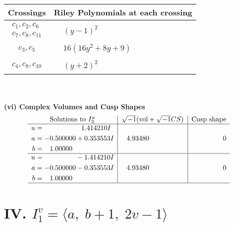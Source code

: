 \documentclass[1p]{elsarticle_modified}
\theoremstyle{definition}
\newcommand{\I}{\sqrt{-1}}
\begin{document}
\begin{tabular}{m{50pt}|m{274pt}}
Crossings & \hspace{64pt}Riley Polynomials at each crossing \\
\hline $$\begin{aligned}c_{1},c_{2},c_{6}\\c_{7},c_{8},c_{11}\end{aligned}$$&$\begin{aligned}
&(y-1)^2
\end{aligned}$\\
\hline $$\begin{aligned}c_{3},c_{5}\end{aligned}$$&$\begin{aligned}
&16(16 y^2+8 y+9)
\end{aligned}$\\
\hline $$\begin{aligned}c_{4},c_{9},c_{10}\end{aligned}$$&$\begin{aligned}
&(y+2)^2
\end{aligned}$\\
\hline
\end{tabular}\\~\\
\newpage\flushleft \textbf{(vi) Complex Volumes and Cusp Shapes}
$$\begin{array}{c|c|c}  
\text{Solutions to }I^u_{3}& \I (\text{vol} + \sqrt{-1}CS) & \text{Cusp shape}\\
 \hline 
\begin{aligned}
u &= \phantom{-0.000000 -}1.414210 I \\
a &= -0.500000 + 0.353553 I \\
b &= \phantom{-}1.00000\phantom{ +0.000000I}\end{aligned}
 & \phantom{-}4.93480\phantom{ +0.000000I} & \phantom{-0.000000 } 0 \\ \hline\begin{aligned}
u &= \phantom{-0.000000 } -1.414210 I \\
a &= -0.500000 - 0.353553 I \\
b &= \phantom{-}1.00000\phantom{ +0.000000I}\end{aligned}
 & \phantom{-}4.93480\phantom{ +0.000000I} & \phantom{-0.000000 } 0\\
 \hline 
 \end{array}$$\newpage\newpage\renewcommand{\arraystretch}{1}
\centering \section*{IV. $I^v_{1}= \langle a,\;b+1,\;2 v-1 \rangle$}
\end{document}
